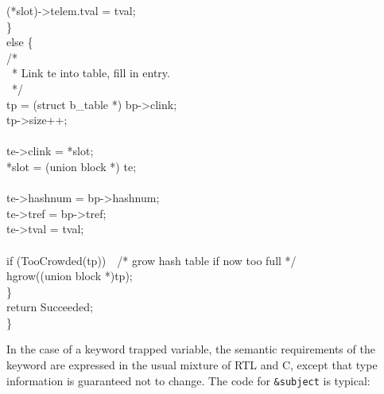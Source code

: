 {\>\>(*slot)->telem.tval = tval;\\
\>\>\}\\
\>else \{\\
\>\>/*\\
\>\>\ * Link te into table, fill in entry.\\
\>\>\ */\\
\>\>tp = (struct b\_table *) bp->clink;\\
\>\>tp->size++;\\
\\
\>\>te->clink = *slot;\\
\>\>*slot = (union block *) te;\\
\\
\>\>te->hashnum = bp->hashnum;\\
\>\>te->tref = bp->tref;\\
\>\>te->tval = tval;\\
\\
\>\>if (TooCrowded(tp))\ \ /* grow hash table if now too full */\\
\>\>\>hgrow((union block *)tp);\\
\>\>\}\\
\>return Succeeded;\\
\}
}

In the case of a keyword trapped variable, the semantic requirements
of the keyword are expressed in the usual mixture of RTL and C, except
that type information is guaranteed not to change. The code for
\texttt{\&subject} is typical:

\goodbreak
{}

